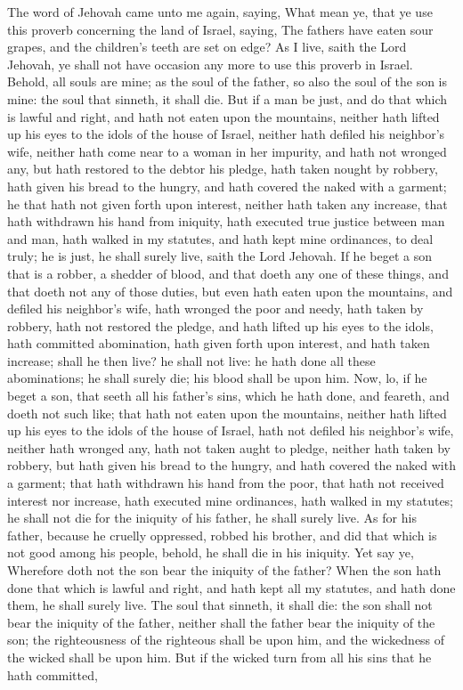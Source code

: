 The word of Jehovah came unto me again, saying, What mean ye, that ye use this proverb concerning the land of Israel, saying, The fathers have eaten sour grapes, and the children’s teeth are set on edge? As I live, saith the Lord Jehovah, ye shall not have occasion any more to use this proverb in Israel. Behold, all souls are mine; as the soul of the father, so also the soul of the son is mine: the soul that sinneth, it shall die.  But if a man be just, and do that which is lawful and right, and hath not eaten upon the mountains, neither hath lifted up his eyes to the idols of the house of Israel, neither hath defiled his neighbor’s wife, neither hath come near to a woman in her impurity, and hath not wronged any, but hath restored to the debtor his pledge, hath taken nought by robbery, hath given his bread to the hungry, and hath covered the naked with a garment; he that hath not given forth upon interest, neither hath taken any increase, that hath withdrawn his hand from iniquity, hath executed true justice between man and man, hath walked in my statutes, and hath kept mine ordinances, to deal truly; he is just, he shall surely live, saith the Lord Jehovah.  If he beget a son that is a robber, a shedder of blood, and that doeth any one of these things, and that doeth not any of those duties, but even hath eaten upon the mountains, and defiled his neighbor’s wife, hath wronged the poor and needy, hath taken by robbery, hath not restored the pledge, and hath lifted up his eyes to the idols, hath committed abomination, hath given forth upon interest, and hath taken increase; shall he then live? he shall not live: he hath done all these abominations; he shall surely die; his blood shall be upon him.  Now, lo, if he beget a son, that seeth all his father’s sins, which he hath done, and feareth, and doeth not such like; that hath not eaten upon the mountains, neither hath lifted up his eyes to the idols of the house of Israel, hath not defiled his neighbor’s wife, neither hath wronged any, hath not taken aught to pledge, neither hath taken by robbery, but hath given his bread to the hungry, and hath covered the naked with a garment; that hath withdrawn his hand from the poor, that hath not received interest nor increase, hath executed mine ordinances, hath walked in my statutes; he shall not die for the iniquity of his father, he shall surely live. As for his father, because he cruelly oppressed, robbed his brother, and did that which is not good among his people, behold, he shall die in his iniquity.  Yet say ye, Wherefore doth not the son bear the iniquity of the father? When the son hath done that which is lawful and right, and hath kept all my statutes, and hath done them, he shall surely live. The soul that sinneth, it shall die: the son shall not bear the iniquity of the father, neither shall the father bear the iniquity of the son; the righteousness of the righteous shall be upon him, and the wickedness of the wicked shall be upon him.  But if the wicked turn from all his sins that he hath committed, 